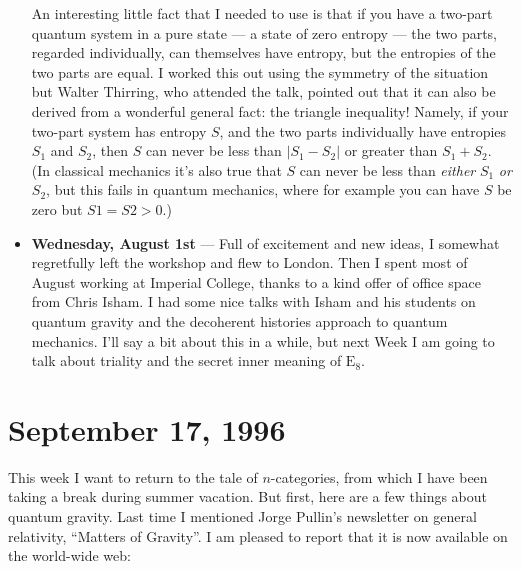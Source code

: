 \documentclass{article}
\def\tightlist{}
\renewcommand{\texttt}[1]{%
  \begingroup
  \ttfamily
  \begingroup\lccode`~=`/\lowercase{\endgroup\def~}{/\discretionary{}{}{}}%
  \begingroup\lccode`~=`[\lowercase{\endgroup\def~}{[\discretionary{}{}{}}%
  \begingroup\lccode`~=`.\lowercase{\endgroup\def~}{.\discretionary{}{}{}}%
  \catcode`/=\active\catcode`[=\active\catcode`.=\active
  \scantokens{#1\noexpand}%
  \endgroup
}
\begin{document}
\begin{itemize}
  An interesting little fact that I needed to use is that if you have a
  two-part quantum system in a pure state --- a state of zero entropy
  --- the two parts, regarded individually, can themselves have entropy,
  but the entropies of the two parts are equal. I worked this out using
  the symmetry of the situation but Walter Thirring, who attended the
  talk, pointed out that it can also be derived from a wonderful general
  fact: the triangle inequality! Namely, if your two-part system has
  entropy \(S\), and the two parts individually have entropies \(S_1\)
  and \(S_2\), then \(S\) can never be less than \(|S_1 - S_2|\) or
  greater than \(S_1 + S_2\). (In classical mechanics it's also true
  that \(S\) can never be less than \emph{either} \(S_1\) \emph{or}
  \(S_2\), but this fails in quantum mechanics, where for example you
  can have \(S\) be zero but \(S1 = S2 > 0\).)
\item
  \textbf{Wednesday, August 1st} --- Full of excitement and new ideas, I
  somewhat regretfully left the workshop and flew to London. Then I
  spent most of August working at Imperial College, thanks to a kind
  offer of office space from Chris Isham. I had some nice talks with
  Isham and his students on quantum gravity and the decoherent histories
  approach to quantum mechanics. I'll say a bit about this in a while,
  but next Week I am going to talk about triality and the secret inner
  meaning of \(\mathrm{E}_8\).
\end{itemize}
\hypertarget{week89}{%
\section{September 17, 1996}\label{week89}}

This week I want to return to the tale of \(n\)-categories, from which I
have been taking a break during summer vacation. But first, here are a
few things about quantum gravity. Last time I mentioned Jorge Pullin's
newsletter on general relativity, ``Matters of Gravity''. I am pleased
to report that it is now available on the world-wide web:

\end{document}
